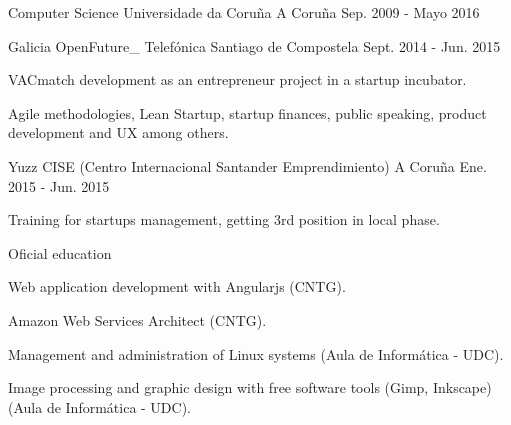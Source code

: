 


\begin{cventries}


\cventry
{Computer Science} %
{Universidade da Coruña} %
{A Coruña} %
{Sep. 2009 - Mayo 2016} %
{ %
\begin{cvitems}
\end{cvitems}
}


\cventry
{Galicia OpenFuture\_} %
{Telefónica} %
{Santiago de Compostela} %
{Sept. 2014 - Jun. 2015} %
{ %
\begin{cvitems}
\item {VACmatch development as an entrepreneur project in a startup 
incubator.}
\item {Agile methodologies, Lean Startup, startup finances, public speaking, 
product development and UX among others.}
\end{cvitems}
}



\cventry
{Yuzz} %
{CISE (Centro Internacional Santander Emprendimiento)} %
{A Coruña} %
{Ene. 2015 - Jun. 2015} %
{ %
\begin{cvitems}
\item {Training for startups management, getting 3rd position in 
local phase.}
\end{cvitems}
}


\cventry
{Oficial education} %
{} %
{} %
{} %
{ %
\begin{cvitems}
\item {Web application development with Angularjs (CNTG).}
\item {Amazon Web Services Architect (CNTG).}
\item {Management and administration of Linux systems (Aula de Informática - 
UDC).}
\item {Image processing and graphic design with free software tools
(Gimp, Inkscape) (Aula de Informática - UDC).}
\end{cvitems}
}


\end{cventries}
